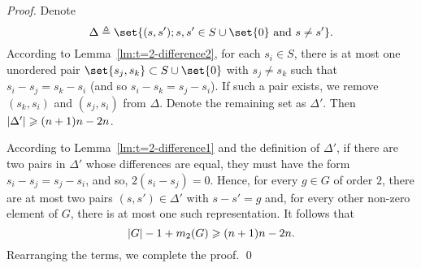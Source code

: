 \documentclass[sort&compress]{elsarticle}
\DeclarePairedDelimiter\abs{\lvert}{\rvert}
\renewcommand{\geq}{\geqslant}
\newcommand{\eqdef}{\triangleq}
\begin{document}
\begin{proof}
  Denote
  \[\Delta \eqdef \set{(s,s') ; s,s'\in S\cup\set{0} \text{ and } s\neq s' }.\]
  According to Lemma~\ref{lm:t=2-difference2}, for each $s_i \in S$,
  there is at most one unordered pair $\set{s_j,s_k} \subset S\cup \set{0}$ with
  $s_j\neq s_k$ such that $s_i-s_j=s_k-s_i$ (and so
  $s_i-s_k=s_j-s_i$). If such a pair exists,  we remove $(s_k,s_i)$ and
  $(s_j,s_i)$ from $\Delta$. Denote the remaining set as $\Delta'$. Then
  $\abs{\Delta'} \geq (n+1)n -2n$.


  According to Lemma~\ref{lm:t=2-difference1} and the definition of
  $\Delta'$, if there are two pairs in $\Delta'$ whose differences are
  equal, they must have the form $s_i-s_j=s_j-s_i$, and so,
  $2(s_i-s_j)=0$. Hence, for every $g \in G$ of order $2$, there are at most two pairs $(s,s') \in \Delta'$ with $s-s'=g$ and, for every other non-zero element of $G$, there is at most one such representation.  It follows that
  \[\abs{G}-1+m_2(G)\geq  (n+1)n -2n.\]
  Rearranging the terms, we complete the proof.
\qed\end{proof}
\end{document}
